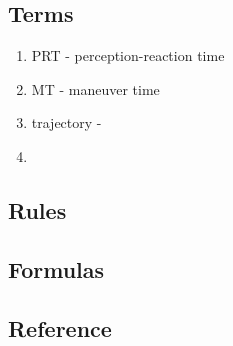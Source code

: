 \documentclass{article}
\begin{document}
  \subsection{Terms}
  \begin{enumerate}
    \item PRT - perception-reaction time
    \item MT - maneuver time
    \item trajectory -  
    \item 
  \end{enumerate}


  \subsection{Rules}

  \subsection{Formulas}


  \subsection{Reference}

  \newpage





\end{document}
